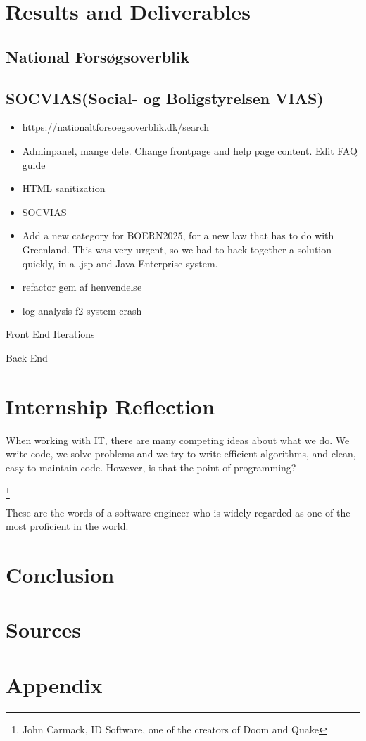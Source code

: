 \documentclass[../main.tex]{subfiles}
\begin{document}
\section{Results and Deliverables}
\subsection{National Forsøgsoverblik}
\subsection{SOCVIAS(Social- og Boligstyrelsen VIAS)}
\label{sec:results}

\begin{itemize}
    \item https://nationaltforsoegsoverblik.dk/search 
    \item Adminpanel, mange dele. Change frontpage and help page content. Edit FAQ guide 
    \item HTML sanitization 
    \item SOCVIAS 
    \item Add a new category for BOERN2025, for a new law that has to do with Greenland. This was very urgent, so we had to hack together a solution quickly, in a .jsp and Java Enterprise system. 
    \item refactor gem af henvendelse
    \item log analysis f2 system crash
\end{itemize}


Front End Iterations 

Back End 

\section{Internship Reflection}
\label{sec:reflection}

When working with IT, there are many competing ideas about what we do. We write
code, we solve problems and we try to write efficient algorithms, and clean, easy to maintain code. However, is that the point of programming? 

\footnote{John Carmack, ID Software, one of the creators of Doom and Quake}

These are the words of a software engineer who is  widely regarded as one of the most proficient in the world.


\section{Conclusion}
\label{sec:conclusion}


\section{Sources}
\label{sec:sources}

\section{Appendix}
\label{sec:appendix}
\end{document}
